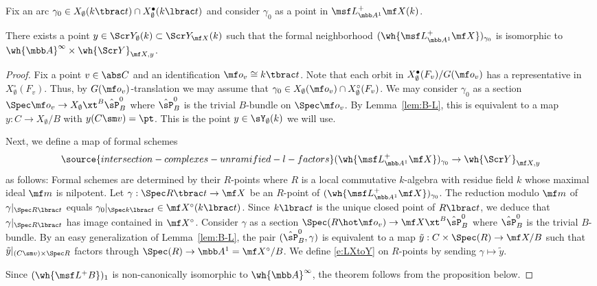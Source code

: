 \subsubsection{}
Fix an arc $\gamma_0 \in X_\emptyset(k\tbrac t) \cap X_\emptyset^\bullet(k\lbrac t)$
and consider $\gamma_0$ as a point in $\msf L^+_{\mbb A^1} \mf X (k)$.

\begin{thm}
\notready  \label{thm:DGKfamily}
There exists a point $y \in \Scr Y_\emptyset(k) \subset \Scr Y_{\mf X}(k)$
such that the formal neighborhood $(\wh{\msf L^+_{\mbb A^1} \mf X})_{\gamma_0}$
is isomorphic to $\wh{\mbb A}^\infty \times \wh{\Scr Y}_{\mf X, y}$.
\end{thm}

\begin{proof}
Fix a point $v \in \abs C$ and an identification $\mf o_v \cong k\tbrac t$.
Note that each orbit in $X_\emptyset^\bullet(F_v)/G(\mf o_v)$
has a representative in $X_\emptyset^\circ(F_v)$.
Thus, by $G(\mf o_v)$-translation we may assume that $\gamma_0 \in X_\emptyset(\mf o_v) \cap X_\emptyset^\circ(F_v)$.
We may consider $\gamma_0$ as a section $\Spec \mf o_v \to X_\emptyset \xt^B \hat\sP_B^0$
where $\hat\sP_B^0$ is the trivial $B$-bundle on $\Spec \mf o_v$.
By Lemma~\ref{lem:B-L}, this is equivalent to a map
$y: C \to X_\emptyset/B$ with $y(C\sm v) = \pt$.
This is the point $y\in \sY_\emptyset(k)$ we will use.



Next, we define a map of formal schemes
\begin{equation}  \label{e:LXtoY}
\source{intersection-complexes-unramified-l-factors}
(\wh{\msf L^+_{\mbb A^1} \mf X})_{\gamma_0} \to \wh{\Scr Y}_{\mf X,y}
\end{equation}
as follows:
Formal schemes are determined by
their $R$-points where $R$ is a local commutative
$k$-algebra with residue field $k$ whose maximal ideal $\mf m$ is nilpotent.
Let $\gamma : \Spec R\tbrac t \to \mf X$ be an $R$-point
of $(\wh{\msf L^+_{\mbb A^1} \mf X})_{\gamma_0}$.
The reduction modulo $\mf m$ of $\gamma|_{\Spec R\lbrac t}$
equals $\gamma_0|_{\Spec k\lbrac t} \in \mf X^\circ(k\lbrac t)$.
Since $k\lbrac t$ is the unique closed point of $R\lbrac t$,
we deduce that $\gamma|_{\Spec R\lbrac t}$ has image contained in $\mf X^\circ$.
Consider $\gamma$ as a section $\Spec(R \hot \mf o_v) \to \mf X \xt^B \hat\sP_B^0$
where $\hat\sP_B^0$ is the trivial $B$-bundle.
By an easy generalization of Lemma~\ref{lem:B-L},
the pair $(\hat\sP^0_B, \gamma)$ is equivalent to a map
$\tilde y : C\times \Spec(R) \to \mf X/B$
such that $\tilde y|_{(C\sm v)\times \Spec R}$
factors through $\Spec(R) \to \mbb A^1 = \mf X^\circ/B$.
We define \eqref{e:LXtoY} on $R$-points by sending
$\gamma \mapsto \tilde y$.

Since $(\wh{\msf L^+ B})_1$ is non-canonically isomorphic to
$\wh{\mbb A}^\infty$, the theorem follows from
the proposition below.
\end{proof}

